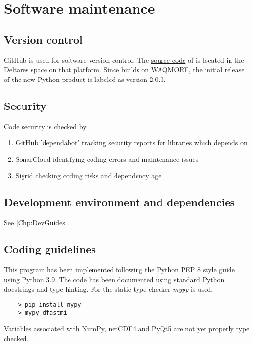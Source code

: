 \chapter{Software maintenance}

\section{Version control}

GitHub is used for software version control.
The \href{https://github.com/Deltares/D-FAST_Morphological_Impact}{source code} of \dfastmi is located in the Deltares space on that platform.
Since \dfastmi builds on WAQMORF, the initial release of the new Python product is labeled as version 2.0.0.

\section{Security}

Code security is checked by
\begin{enumerate}
\item GitHub 'dependabot' tracking security reports for libraries which \dfmi depends on
\item SonarCloud identifying coding errors and maintenance issues
\item Sigrid checking coding risks and dependency age
\end{enumerate}

\section{Development environment and dependencies}

See \autoref{Chp:DevGuides}.

\section{Coding guidelines}

This program has been implemented following the Python PEP 8 style guide using Python 3.9.
The code has been documented using standard Python docstrings and type hinting.
For the static type checker \emph{mypy} is used.

\begin{Verbatim}
    > pip install mypy
    > mypy dfastmi
\end{Verbatim}

Variables associated with NumPy, netCDF4 and PyQt5 are not yet properly type checked.

